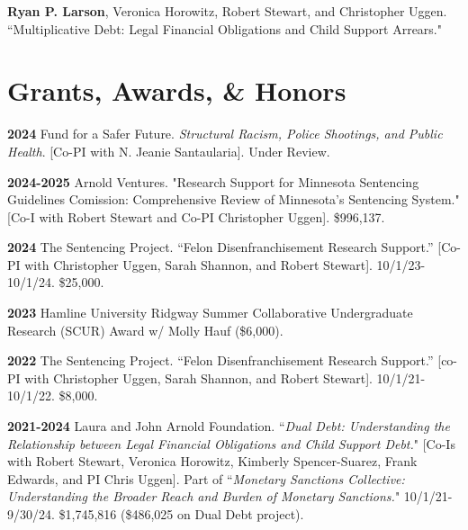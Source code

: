 \documentclass[letterpaper]{article}
\newenvironment{publist}{%
  \begin{list}{}{%
    \setlength{\leftmargin}{0cm}   %
    \setlength{\labelwidth}{2cm}     %
    \setlength{\labelsep}{0.5cm}     %
  }%
}{%
  \end{list}%
}
\begin{document}
\begin{publist}
\item \textbf{Ryan P. Larson}, Veronica Horowitz, Robert Stewart, and Christopher Uggen. ``Multiplicative Debt: Legal Financial Obligations and Child Support Arrears."



\end{publist}

\section*{\textbf{Grants, Awards, \& Honors}}

\begin{publist}

\item[\textbf{2024}] Fund for a Safer Future. \textit{Structural Racism, Police Shootings, and Public Health}. [Co-PI with N. Jeanie Santaularia]. Under Review.  

\item[\textbf{2024-2025}] Arnold Ventures. "Research Support for Minnesota Sentencing Guidelines Comission: Comprehensive Review of Minnesota's Sentencing System." [Co-I with Robert Stewart and Co-PI Christopher Uggen]. \$996,137. 

\item[\textbf{2024}] The Sentencing Project. “Felon Disenfranchisement Research Support.” [Co-PI with Christopher Uggen, Sarah Shannon, and Robert Stewart]. 10/1/23-10/1/24. \$25,000.

\item[\textbf{2023}] Hamline University Ridgway Summer Collaborative Undergraduate Research (SCUR) Award w/ Molly Hauf (\$6,000).

\item[\textbf{2022}]The Sentencing Project. “Felon Disenfranchisement Research Support.” [co-PI with Christopher Uggen, Sarah Shannon, and Robert Stewart]. 10/1/21-10/1/22. \$8,000.

\item[\textbf{2021-2024}]  Laura and John Arnold Foundation. ``\textit{Dual Debt: Understanding the Relationship between Legal Financial Obligations and Child Support Debt.}" [Co-Is with Robert Stewart, Veronica Horowitz, Kimberly Spencer-Suarez, Frank Edwards, and PI Chris Uggen]. Part of ``\textit{Monetary Sanctions Collective: Understanding the Broader Reach and Burden of Monetary Sanctions.}" 10/1/21-9/30/24. \$1,745,816 (\$486,025 on Dual Debt project).


\end{publist}
\end{document}
